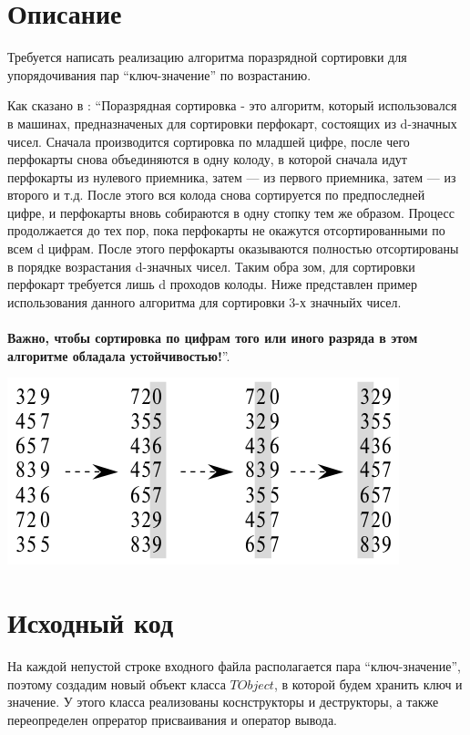 \section{Описание}
Требуется написать реализацию алгоритма поразрядной сортировки для упорядочивания пар \enquote{ключ-значение} по возрастанию.

Как сказано в \cite{Kormen}: \enquote{Поразрядная сортировка - это алгоритм, который использовался в машинах, предназначеных для сортировки перфокарт,
состоящих из d-значных чисел. 
Сначала производится сортировка по младшей цифре, после чего перфокарты снова объединяются в одну колоду,
 в которой сначала идут перфокарты из нулевого приемника, затем — из
первого приемника, затем — из второго и т.д. После этого вся колода снова сортируется по предпоследней цифре,
 и перфокарты вновь собираются в одну стопку
тем же образом. Процесс продолжается до тех пор, пока перфокарты не окажутся отсортированными по всем d цифрам. 
После этого перфокарты оказываются
полностью отсортированы в порядке возрастания d-значных чисел. Таким обра
зом, для сортировки перфокарт требуется лишь d проходов колоды.
Ниже представлен пример использования данного алгоритма для сортировки 3-х значныйх чисел.\\
\\
\textbf{Важно, чтобы сортировка по цифрам того или иного разряда в этом алгоритме
обладала устойчивостью!}}.

\includegraphics{src/radix_sort_impl.png}

\pagebreak

\section{Исходный код}

На каждой непустой строке входного файла располагается пара \enquote{ключ-значение}, поэтому создадим новый 
объект класса $TObject$, в которой будем хранить ключ и значение. У этого класса реализованы коснструкторы и деструкторы, 
а также переопределен опрератор присваивания и оператор вывода.


